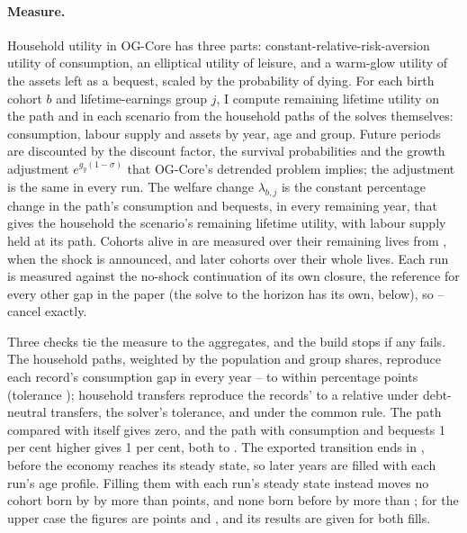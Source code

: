 \paragraph{Measure.} Household utility in OG-Core has three parts: constant-relative-risk-aversion utility of consumption, an elliptical utility of leisure, and a warm-glow utility of the assets left as a bequest, scaled by the probability of dying. For each birth cohort $b$ and lifetime-earnings group $j$, I compute remaining lifetime utility on the path and in each scenario from the household paths of the solves themselves: consumption, labour supply and assets by year, age and group. Future periods are discounted by the discount factor, the survival probabilities and the growth adjustment $e^{g_y(1-\sigma)}$ that OG-Core's detrended problem implies; the adjustment is the same in every run. The welfare change $\lambda_{b,j}$ is the constant percentage change in the path's consumption and bequests, in every remaining year, that gives the household the scenario's remaining lifetime utility, with labour supply held at its path. Cohorts alive in \genShockYear{} are measured over their remaining lives from \genShockYear{}, when the shock is announced, and later cohorts over their whole lives. Each run is measured against the no-shock continuation of its own closure, the reference for every other gap in the paper (the solve to the horizon has its own, below), so \genStartYear--\genRampZeroYear{} cancel exactly.

Three checks tie the measure to the aggregates, and the build stops if any fails. The household paths, weighted by the population and group shares, reproduce each record's consumption gap in every year \genShockYear--\genDebtRuleYear{} to within \genCohReconMaxPpCentral{} percentage points (tolerance \genCohReconTolPp{}); household transfers reproduce the records' to a relative \genCohTrReconMaxRelDnCentral{} under debt-neutral transfers, the solver's tolerance, and \genCohTrReconMaxRelCommonCentral{} under the common rule. The path compared with itself gives zero, and the path with consumption and bequests 1 per cent higher gives 1 per cent, both to \genCohIdentityMaxCentral{}. The exported transition ends in \genCohLastExportYear{}, before the economy reaches its steady state, so later years are filled with each run's \genCohLastExportYear{} age profile. Filling them with each run's steady state instead moves no cohort born by \genCohFigLastBirth{} by more than \genCohFillMaxPpCentral{} points, and none born before \genCohFillFirstBirthCentral{} by more than \genCohFillTinyPp{}; for the upper case the figures are \genCohKorFillMaxPpCentral{} points and \genCohKorFillFirstBirthCentral{}, and its results are given for both fills.

